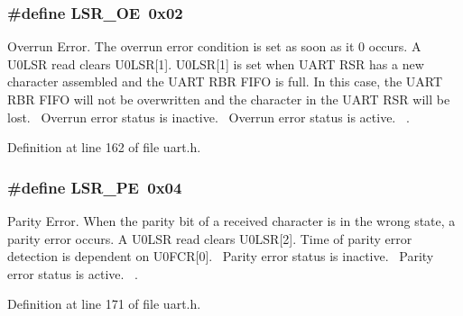 \subsubsection[{\texorpdfstring{L\+S\+R\+\_\+\+OE}{LSR_OE}}]{\setlength{\rightskip}{0pt plus 5cm}\#define L\+S\+R\+\_\+\+OE~0x02}\hypertarget{group___r_e_g_i_s_t_r_o___l_s_r_gae844dd49bb0e0770bcf46ad5bfe20973}{}\label{group___r_e_g_i_s_t_r_o___l_s_r_gae844dd49bb0e0770bcf46ad5bfe20973}


Overrun Error. The overrun error condition is set as soon as it 0 occurs. A U0\+L\+SR read clears U0\+L\+SR\mbox{[}1\mbox{]}. U0\+L\+SR\mbox{[}1\mbox{]} is set when U\+A\+RT R\+SR has a new character assembled and the U\+A\+RT R\+BR F\+I\+FO is full. In this case, the U\+A\+RT R\+BR F\+I\+FO will not be overwritten and the character in the U\+A\+RT R\+SR will be lost.~ Overrun error status is inactive.~ Overrun error status is active.~\newline
. 



Definition at line 162 of file uart.\+h.

\subsubsection[{\texorpdfstring{L\+S\+R\+\_\+\+PE}{LSR_PE}}]{\setlength{\rightskip}{0pt plus 5cm}\#define L\+S\+R\+\_\+\+PE~0x04}\hypertarget{group___r_e_g_i_s_t_r_o___l_s_r_ga0ee28cdbc0917173f06cc39527452a8f}{}\label{group___r_e_g_i_s_t_r_o___l_s_r_ga0ee28cdbc0917173f06cc39527452a8f}


Parity Error. When the parity bit of a received character is in the wrong state, a parity error occurs. A U0\+L\+SR read clears U0\+L\+SR\mbox{[}2\mbox{]}. Time of parity error detection is dependent on U0\+F\+CR\mbox{[}0\mbox{]}.~ Parity error status is inactive.~ Parity error status is active.~\newline
. 



Definition at line 171 of file uart.\+h.

